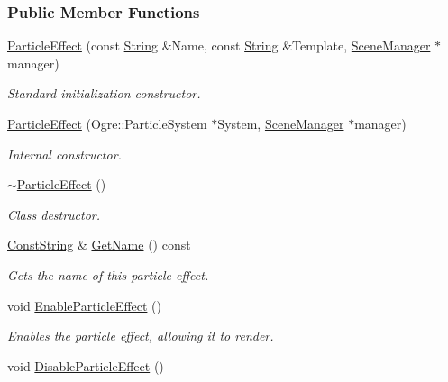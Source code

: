 \subsubsection*{Public Member Functions}
\begin{DoxyCompactItemize}
\item 
\hyperlink{classphys_1_1ParticleEffect_a42d17b7cd81968603c70920c30e6f812}{ParticleEffect} (const \hyperlink{namespacephys_aa03900411993de7fbfec4789bc1d392e}{String} \&Name, const \hyperlink{namespacephys_aa03900411993de7fbfec4789bc1d392e}{String} \&Template, \hyperlink{classphys_1_1SceneManager}{SceneManager} $\ast$manager)
\begin{DoxyCompactList}\small\item\em Standard initialization constructor. \item\end{DoxyCompactList}\item 
\hyperlink{classphys_1_1ParticleEffect_a112c7e4b2ec7c34c3aba3bd422ef8a1c}{ParticleEffect} (Ogre::ParticleSystem $\ast$System, \hyperlink{classphys_1_1SceneManager}{SceneManager} $\ast$manager)
\begin{DoxyCompactList}\small\item\em Internal constructor. \item\end{DoxyCompactList}\item 
\hypertarget{classphys_1_1ParticleEffect_a8c9c3d0cd1d02acdc626266ee485f51f}{
\hyperlink{classphys_1_1ParticleEffect_a8c9c3d0cd1d02acdc626266ee485f51f}{$\sim$ParticleEffect} ()}
\label{d2/d69/classphys_1_1ParticleEffect_a8c9c3d0cd1d02acdc626266ee485f51f}

\begin{DoxyCompactList}\small\item\em Class destructor. \item\end{DoxyCompactList}\item 
\hyperlink{namespacephys_a5ce5049f8b4bf88d6413c47b504ebb31}{ConstString} \& \hyperlink{classphys_1_1ParticleEffect_a770309a3ec74b8bff6169ce5aecc64e7}{GetName} () const 
\begin{DoxyCompactList}\small\item\em Gets the name of this particle effect. \item\end{DoxyCompactList}\item 
void \hyperlink{classphys_1_1ParticleEffect_aee95ac9b688885361d3066a5a4b83965}{EnableParticleEffect} ()
\begin{DoxyCompactList}\small\item\em Enables the particle effect, allowing it to render. \item\end{DoxyCompactList}\item 
\hypertarget{classphys_1_1ParticleEffect_abd9f2339d22582055fe4ae45f986ff8c}{
void \hyperlink{classphys_1_1ParticleEffect_abd9f2339d22582055fe4ae45f986ff8c}{DisableParticleEffect} ()}
\label{d2/d69/classphys_1_1ParticleEffect_abd9f2339d22582055fe4ae45f986ff8c}


\end{DoxyCompactItemize}
